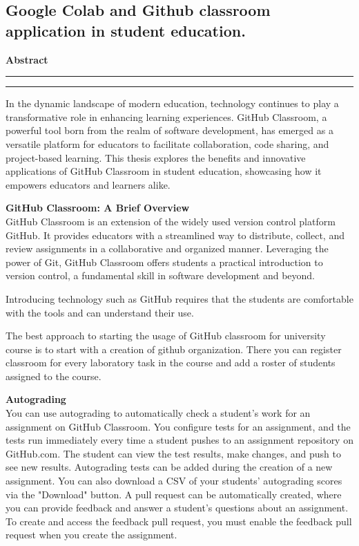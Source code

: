\documentclass[a4paper,11pt]{article}
\begin{document}


\begin{large}

\begin{center}
\section*{Google Colab and Github classroom application in student education.}
\end{center}

\medskip

\begin{center}
\textbf{Abstract}
\end{center}


\hrule height 1pt
\vskip 3pt \hrule

\medskip
\medskip

In the dynamic landscape of modern education, technology continues to play a transformative role in enhancing learning experiences. GitHub Classroom, a powerful tool born from the realm of software development, has emerged as a versatile platform for educators to facilitate collaboration, code sharing, and project-based learning. This thesis explores the benefits and innovative applications of GitHub Classroom in student education, showcasing how it empowers educators and learners alike.

\textbf{GitHub Classroom: A Brief Overview} \\
GitHub Classroom is an extension of the widely used version control platform GitHub. It provides educators with a streamlined way to distribute, collect, and review assignments in a collaborative and organized manner. Leveraging the power of Git, GitHub Classroom offers students a practical introduction to version control, a fundamental skill in software development and beyond. 

Introducing technology such as GitHub requires that the students are comfortable with the
tools and can understand their use.

The best approach to starting the usage of GitHub classroom for university course is to start with a creation of github organization. There you can register classroom for every laboratory task in the course and add a roster of students assigned to the course.

\textbf{Autograding} \\
You can use autograding to automatically check a student's work for an assignment on GitHub Classroom. You configure tests for an assignment, and the tests run immediately every time a student pushes to an assignment repository on GitHub.com. The student can view the test results, make changes, and push to see new results. Autograding tests can be added during the creation of a new assignment. You can also download a CSV of your students' autograding scores via the "Download" button. A pull request can be automatically created, where you can provide feedback and answer a student's questions about an assignment. To create and access the feedback pull request, you must enable the feedback pull request when you create the assignment.


\end{large}
\end{document}
